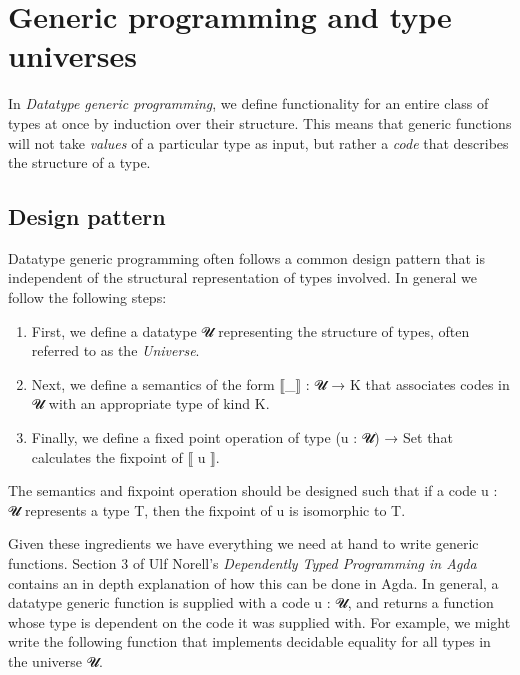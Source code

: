 \documentclass[a4paper,msc,twosized=semi]{uustthesis}
\let\oldemph\emph
\renewcommand\emph[1]{{\large\oldemph{#1}}}
\newcommand{\agda}[1]{{\agdafontinline\color{agdacolor}#1}}
\begin{document}
\section{Generic programming and type universes}

  In \emph{Datatype generic programming}, we define functionality for an entire class of types 
  at once by induction over their structure. This means that generic 
  functions will not take \emph{values} of a particular type as input, but rather a \emph{code} that 
  describes the structure of a type. 

\subsection{Design pattern}\label{sec:tudesignpattern}

  Datatype generic programming often follows a common design pattern that is 
  independent of the structural representation of types involved. In general 
  we follow the following steps: 

  \begin{enumerate}
    \item
      First, we define a datatype \agda{𝓤} representing the structure of types, 
      often referred to as the \emph{Universe}. 
    \item 
      Next, we define a semantics of the form \agda{⟦\_⟧ : 𝓤 → K} that associates codes in \agda{𝓤} 
      with an appropriate type of kind \agda{K}. 
    \item 
      Finally, we define a fixed point operation of type \agda{(u : 𝓤) → Set}
      that calculates the fixpoint of \agda{⟦ u ⟧}. 
  \end{enumerate}

  The semantics and fixpoint operation should be designed such that if a code \agda{u : 𝓤}
  represents a type \agda{T}, then the fixpoint of \agda{u} is isomorphic to \agda{T}. 

  Given these ingredients we have everything we need at hand to write generic 
  functions. Section $3$ of Ulf Norell's \emph{Dependently Typed Programming 
  in Agda} \cite{norell2008dependently} contains an in depth explanation of 
  how this can be done in Agda. In general, a datatype generic function is supplied
  with a code \agda{u : 𝓤}, and returns a function whose type is dependent on the 
  code it was supplied with. For example, we might write the following function 
  that implements decidable equality for all types in the universe \agda{𝓤}. 
\end{document}
